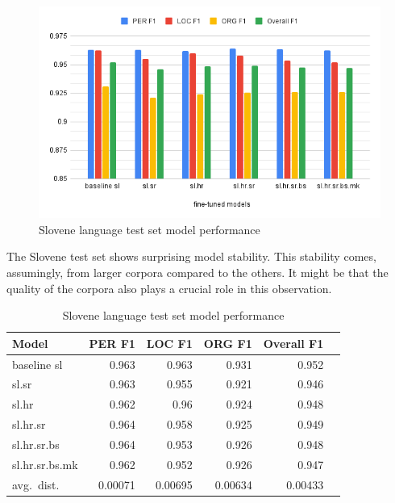 \documentclass[sigconf]{acmart}
\begin{document}
\begin{figure}[H]
  \centering
  \includegraphics[width=\linewidth]{eval_sl}
  \caption{Slovene language test set model performance} %
  \label{fig:eval_sl}
\end{figure}

The Slovene test set shows surprising model stability.
This stability comes, assumingly, from larger corpora compared to the others.
It might be that the quality of the corpora also plays a crucial role in this observation.

\begin{table}[H]
  \caption{Slovene language test set model performance}
  \label{tab:eval_sl}
  \begin{tabular}{lrrrrr}
    \toprule
    Model&PER F1&LOC F1&ORG F1&Overall F1\\
    \midrule
    baseline sl&0.963&0.963&0.931&0.952\\
    \midrule
    sl.sr&0.963&0.955&0.921&0.946\\
    sl.hr&0.962&0.96&0.924&0.948\\
    sl.hr.sr&0.964&0.958&0.925&0.949\\
    sl.hr.sr.bs&0.964&0.953&0.926&0.948\\
    sl.hr.sr.bs.mk&0.962&0.952&0.926&0.947\\
    \midrule
    avg.\ dist.&0.00071&0.00695&0.00634&0.00433\\
    \bottomrule
  \end{tabular}
\end{table}
\end{document}
